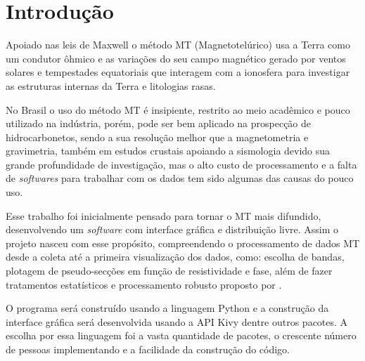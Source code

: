 

\chapter{Introdução}
    \label{cap-introducao}
    
	Apoiado nas leis de Maxwell o método MT (Magnetotelúrico) usa a Terra como 
	um condutor ôhmico e as variações do seu campo 
	magnético gerado por ventos solares \cite{parkinson93} e tempestades equatoriais 
	que interagem com a ionosfera para investigar as 
	estruturas internas da Terra e litologias rasas. 
	
	
	No Brasil o uso do método MT é insipiente, restrito ao meio acadêmico e pouco
	utilizado na indústria, porém, pode ser bem aplicado na prospecção de 
	hidrocarbonetos, sendo a sua resolução melhor que a magnetometria
	e gravimetria, também em estudos crustais
	apoiando a sismologia devido sua grande profundidade de investigação, mas o 
	alto custo de processamento e a falta de \textit{softwares} para trabalhar com os 
	dados tem sido algumas das causas do pouco uso.
	
	
	Esse trabalho foi inicialmente pensado para tornar o MT mais difundido, 
	desenvolvendo um \textit{software} com interface gráfica e 
	distribuição livre. Assim o projeto nasceu 
	com esse propósito, compreendendo o processamento de dados
	MT desde a coleta até a primeira visualização dos dados, como: escolha 
	de bandas, plotagem de pseudo-secções em função de resistividade e fase, além de fazer tratamentos estatísticos e processamento robusto 
	proposto por \citeauthor{egbert97} \citeyearpar{egbert97}.
	
	
	O programa será construído usando a linguagem Python \cite{python36} 
	e a construção da interface gráfica será desenvolvida usando a API
	Kivy \cite{kivy110} dentre outros pacotes. A escolha por essa linguagem foi a vasta quantidade de pacotes,  o crescente 
	número de pessoas implementando e a facilidade da construção do código.



